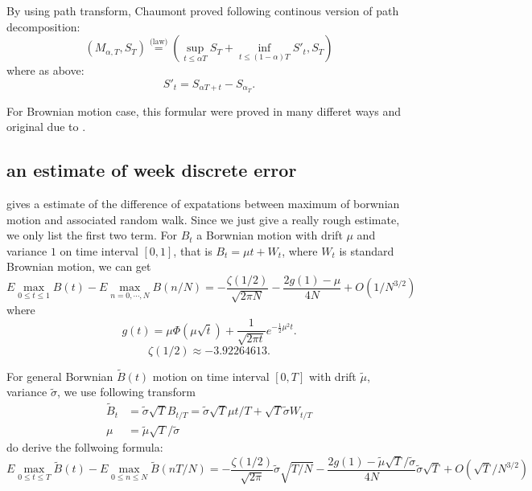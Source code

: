 \documentclass[11pt]{book}
\def\eqlaw{{\stackrel{\text{(law)}}{=}}}
\def\tB{{\widetilde{B}}}
\def\tmu{{\widetilde{\mu}}}
\def\tsigma{{\widetilde{\sigma}}}
\begin{document}
By using path transform, Chaumont proved
following continous version of path decomposition:
\begin{equation}\label{eq:cpathdec}
(M_{\alpha,T}, S_T) \eqlaw (\sup_{t\leq \alpha{T}} S_T +\inf_{t \leq (1-\alpha)T} S'_t, S_T)
\end{equation}
where as above:
\[
S'_t = S_{\alpha T+t} - S_{\alpha_T}.
\]

For Brownian motion case, this formular were proved in many differet ways
and original due to \cite{Dassios1995}.

\subsection{an estimate of week discrete error}
\cite{Janssen2008} gives a estimate of the difference of  expatations
between maximum of borwnian motion and associated random walk.
Since we just give a really rough estimate, we only list the first two term.
For $B_t$ a Borwnian motion with drift $\mu$ and variance $1$ on time interval $[0,1]$, that is $B_t = \mu t + W_t$, where $W_t$ is standard Brownian motion, we can get
\begin{equation}\label{eq:est1}
E\max_{0\leq t \leq 1} B(t) - E\max_{n=0,\cdots, N}B(n/N)
= -\frac{\zeta(1/2)}{\sqrt{2\pi N}}-\frac{2g(1)-\mu}{4N} + O(1/N^{3/2})
\end{equation}
where
\[
g(t) = \mu \Phi(\mu \sqrt{t}) + \frac{1}{\sqrt{2\pi t}} e^{-\frac{1}{2}\mu^2 t}.
\]
\[
\zeta(1/2) \approx -3.92264613.
\]

For general Borwnian $\tB(t)$ motion on time interval $[0,T]$ with drift $\tmu$, variance $\tsigma$,
we use following transform
\begin{align*}
\tB_t &= \tsigma \sqrt{T} B_{t/T} = \tsigma \sqrt{T} \mu t/T
+ \sqrt{T}\tsigma W_{t/T}\\
\mu &= \tmu \sqrt{T}/\tsigma
\end{align*}
do derive the follwoing formula:
\begin{equation}\label{eq:maxest}
E\max_{0\leq t\leq T} \tB(t) - E \max_{0\leq n \leq N} \tB(nT/N) =
 -\frac{\zeta(1/2)}{\sqrt{2\pi}}\tsigma \sqrt{T/N}
 -\frac{2g(1)-\tmu\sqrt{T} / \tsigma}{4N}\tsigma\sqrt{T} +
O(\sqrt{T}/N^{3/2})
\end{equation}
\end{document}
